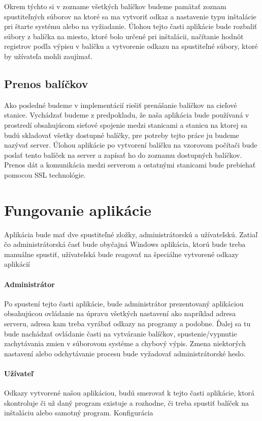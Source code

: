 Okrem týchto si v zozname všetkých balíčkov budeme pamätať zoznam spustiteľných súborov na ktoré sa ma vytvoriť odkaz a nastavenie typu inštalácie pri štarte systému alebo na vyžiadanie. Úlohou tejto časti aplikácie bude rozbaliť súbory z balíčka na miesto, ktoré bolo určené pri inštalácii, načítanie hodnôt registrov podľa výpisu v balíčku a vytvorenie odkazu na spustiteľné súbory, ktoré by užívateľa mohli zaujímať.

\subsection{Prenos balíčkov}

Ako posledné budeme v implementácií riešiť prenášanie balíčkov na cieľové stanice. Vychádzať budeme z predpokladu, že naša aplikácia bude používaná v prostredí obsahujúcom sieťové spojenie medzi stanicami a stanicu na ktorej sa budú skladovať všetky dostupné balíčky, pre potreby tejto práce ju budeme nazývať server. Úlohou aplikácie po vytvorení balíčku na vzorovom počítači bude poslať tento balíček na server a zapísať ho do zoznamu dostupných balíčkov. Prenos dát a komunikácia medzi serverom a ostatnými stanicami bude prebiehať pomocou SSL technológie.

\section{Fungovanie aplikácie}

Aplikácia bude mať dve spustiteľné zložky, administrátorskú a užívateľskú. Zatiaľ čo administrátorská časť bude obyčajná Windows aplikácia, ktorú bude treba manuálne spustiť, užívateľská bude reagovať na špeciálne vytvorené odkazy aplikácií
\paragraph{Administrátor}
Po spustení tejto časti aplikácie, bude administrátor prezentovaný aplikáciou obsahujúcou ovládanie na úpravu všetkých nastavení ako napríklad adresa serveru, adresa kam treba vyrábať odkazy na programy a podobne. Ďalej sa tu bude nachádzať ovládanie časti na vytváranie balíčkov, spustenie/vypnutie zachytávania zmien v súborovom systéme a chybový výpis. Zmena niektorých nastavení alebo odchytávanie procesu bude vyžadovať administrátorské heslo.
\paragraph{Užívateľ}
Odkazy vytvorené našou aplikáciou, budú smerovať k tejto časti aplikácie, ktorá skontroluje či už daný program existuje a rozhodne, či treba spustiť balíček na inštaláciu alebo samotný program.
Konfigurácia

